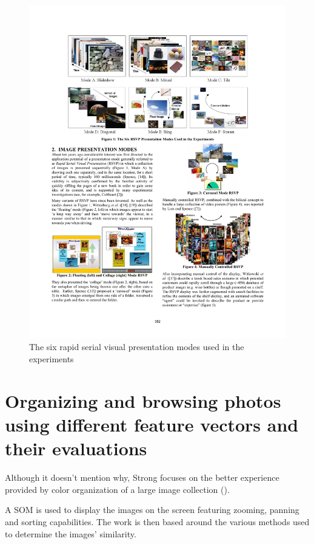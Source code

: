 \begin{figure}[ht]
	\centering
		\includegraphics[width=\textwidth]{imgs-RelatedWork/Cooper1}
	\caption{The six rapid serial visual presentation modes used in the experiments}
	\label{fig:Cooper1}
\end{figure}

\section{Organizing and browsing photos using different feature vectors and their evaluations} %
\label{sub:Strong}

Although it doesn't mention why, Strong \cite{Strong:2009p413} focuses on the better experience provided by color organization of a large image collection ().

A \ac{SOM} is used to display the images on the screen featuring zooming, panning and sorting capabilities. The work is then based around the various methods used to determine the images' similarity.

